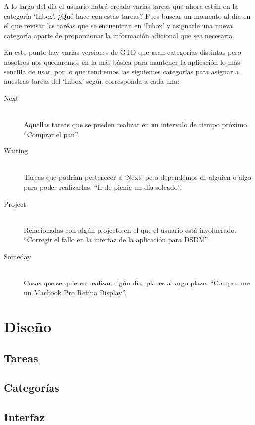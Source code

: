 \documentclass[parskip=half*]{scrartcl}
\begin{document}
A lo largo del día el usuario habrá creado varias tareas que ahora están en la categoría `Inbox'. ¿Qué hace con estas tareas? Pues buscar un momento al día en el que revisar las taréas que se encuentran en `Inbox' y asignarle una nueva categoría aparte de proporcionar la información adicional que sea necesaria.

En este punto hay varias versiones de GTD que usan categorías distintas pero nosotros nos quedaremos en la más básica para mantener la aplicación lo más sencilla de usar, por lo que tendremos las siguientes categorías para asignar a nuestras tareas del `Inbox' según corresponda a cada una:

\begin{description}
	\item[Next] \hfill \\ Aquellas tareas que se pueden realizar en un intervalo de tiempo próximo. ``Comprar el pan''.
	\item[Waiting] \hfill \\ Tareas que podrían pertenecer a `Next' pero dependemos de alguien o algo para poder realizarlas. ``Ir de picnic un día soleado''.
	\item[Project] \hfill \\ Relacionadas con algún projecto en el que el usuario está involucrado. ``Corregir el fallo en la interfaz de la aplicación para DSDM''.
	\item[Someday] \hfill \\ Cosas que se quieren realizar algún día, planes a largo plazo. ``Comprarme un Macbook Pro Retina Display''.
\end{description}

\section{Dise\~no}

\subsection{Tareas}

\subsection{Categorías}

\subsection{Interfaz}
\end{document}
